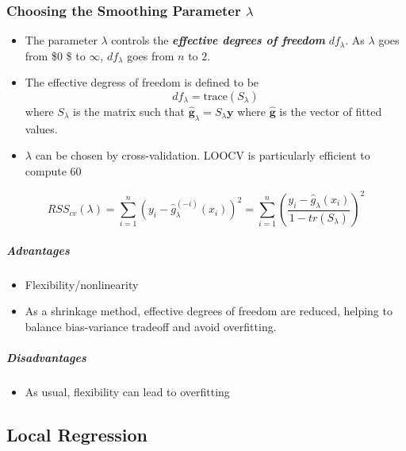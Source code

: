 \documentclass[11pt]{article}
\providecommand{\tightlist}{%
      \setlength{\itemsep}{0pt}\setlength{\parskip}{0pt}}
\begin{document}
    \hypertarget{choosing-the-smoothing-parameter-lambda}{%
\subsubsection{\texorpdfstring{Choosing the Smoothing Parameter
\(\lambda\)}{Choosing the Smoothing Parameter \textbackslash{}lambda}}\label{choosing-the-smoothing-parameter-lambda}}

    \begin{itemize}
\tightlist
\item
  The parameter \(\lambda\) controls the \textbf{\emph{effective degrees
  of freedom}} \(df_{\lambda}\). As \(\lambda\) goes from \$0 \$ to
  \(\infty\), \(df_\lambda\) goes from \(n\) to \(2\).
\item
  The effective degress of freedom is defined to be
  \[df_\lambda = \text{trace}(S_\lambda)\] where \(S_\lambda\) is the
  matrix such that \(\mathbf{\hat{g}}_\lambda = S_\lambda \mathbf{y}\)
  where \(\mathbf{\hat{g}}\) is the vector of fitted values.
\item
  \(\lambda\) can be chosen by cross-validation. LOOCV is particularly
  efficient to compute 60
\end{itemize}

\[RSS_{cv}(\lambda) = \sum_{i=1}^n (y_i - \hat{g}_\lambda^{(-i)}(x_i))^2 = \sum_{i=1}^n\left(\frac{y_i - \hat{g}_\lambda(x_i)}{1-tr(S_{\lambda})}\right)^2 \]

    \hypertarget{advantages}{%
\subparagraph{Advantages}\label{advantages}}

    \begin{itemize}
\tightlist
\item
  Flexibility/nonlinearity
\item
  As a shrinkage method, effective degrees of freedom are reduced,
  helping to balance bias-variance tradeoff and avoid overfitting.
\end{itemize}

    \hypertarget{disadvantages}{%
\subparagraph{Disadvantages}\label{disadvantages}}

    \begin{itemize}
\tightlist
\item
  As usual, flexibility can lead to overfitting
\end{itemize}

    \hypertarget{local-regression}{%
\subsection{Local Regression}\label{local-regression}}
\end{document}
